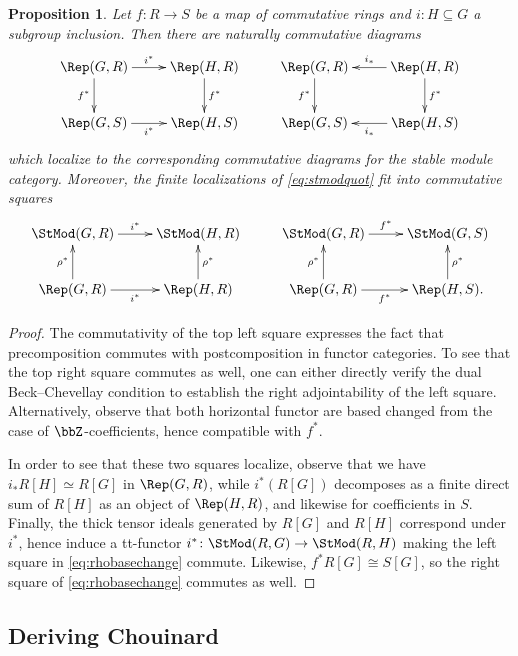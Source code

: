 \documentclass{amsart}%
\numberwithin{equation}{section}%
\newtheorem{Prop}[equation]{Proposition}
\theoremstyle{remark}
\begin{document}
\begin{Prop}\label{prop:basechangecompatibilities}
Let $f\colon R \to S$ be a map of commutative rings and $i\colon H \subseteq G$ a subgroup inclusion. Then there are naturally commutative diagrams
\[
\xymatrix{\Rep(G,R) \ar[r]^-{i^*} \ar[d]_{f^*} & \Rep(H,R) \ar[d]^{f^*} & \Rep(G,R) \ar[d]_{f^*} & \Rep(H,R) \ar[d]^{f^*} \ar[l]_-{i_*} \\
\Rep(G,S) \ar[r]_-{i^*} & \Rep(H,S) & \Rep(G,S) & \Rep(H,S) \ar[l]^-{i_*}}
\]
which localize to the corresponding commutative diagrams for the stable module category. Moreover, the finite localizations of \eqref{eq:stmodquot} fit into  commutative squares
\begin{equation}\label{eq:rhobasechange}
    \vcenter{
    \xymatrix{\StMod(G,R) \ar[r]^-{i^*} & \StMod(H,R) & \StMod(G,R) \ar[r]^-{f^*} & \StMod(G,S) \\
    \Rep(G,R) \ar[r]_-{i^*} \ar[u]^{\rho^*} & \Rep(H,R) \ar[u]_{\rho^*} & \Rep(G,R) \ar[r]_-{f^*} \ar[u]^{\rho^*} & \Rep(H,S). \ar[u]_{\rho^*}}
    }
\end{equation}
\end{Prop}
\begin{proof}
The commutativity of the top left square expresses the fact that precomposition commutes with postcomposition in functor categories. To see that the top right square commutes as well, one can either directly verify the dual Beck--Chevellay condition to establish the right adjointability of the left square. Alternatively, observe that both horizontal functor are based changed from the case of $\bbZ$-coefficients, hence compatible with $f^*$. 

In order to see that these two squares localize, observe that we have $i_*R[H] \simeq R[G]$ in $\Rep(G,R)$, while $i^*(R[G])$ decomposes as a finite direct sum of $R[H]$ as an object of $\Rep(H,R)$, and likewise for coefficients in $S$. Finally, the thick tensor ideals generated by $R[G]$ and $R[H]$ correspond under $i^*$, hence induce a tt-functor $i^*\colon \StMod(R,G) \to \StMod(R,H)$ making the left square in \eqref{eq:rhobasechange} commute. Likewise, $f^*R[G] \cong S[G]$, so the right square of \eqref{eq:rhobasechange} commutes as well.
\end{proof}


\subsection{Deriving Chouinard}\label{ssec:chouinard}
\end{document}
